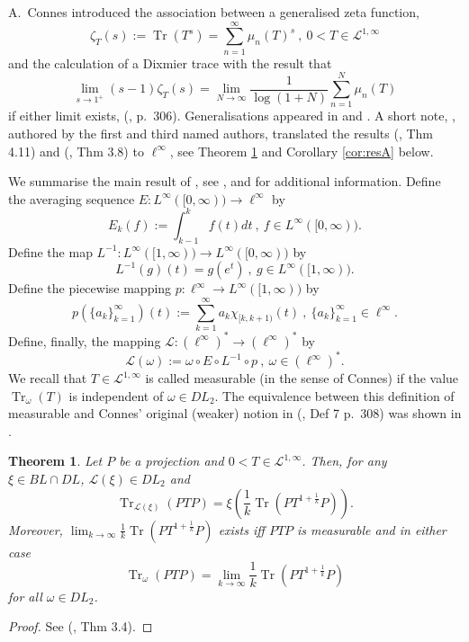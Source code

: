 \documentclass[final,1p]{elsarticle}
\numberwithin{equation}{section}
\theoremstyle{plain}
\newtheorem{thm}{Theorem}[section]
\theoremstyle{definition}
\begin{document}
\medskip A.~Connes introduced the association between a generalised zeta function,
$$
\zeta_T(s) := \operatorname{Tr}(T^s) = \sum_{n=1}^\infty \mu_{n}(T)^s \ , \ 0 < T \in \mathcal{L}^{1,\infty}
$$
and the calculation of a Dixmier trace with the result that
\begin{equation*} 
\lim_{s \to 1^+} (s-1) \zeta_T(s) = \lim_{N \to \infty} \frac{1}{\log(1+N)} \sum_{n=1}^{N} \mu_{n}(T)
\end{equation*}
if either limit exists, (\cite{CN}, p.~306).
Generalisations appeared in \cite{CRSS} and \cite{CPS}.  A short note, \cite{LS2}, authored by the first and third named authors, translated the results (\cite{CRSS}, Thm 4.11) and (\cite{CPS}, Thm 3.8) to $\ell^\infty$, see Theorem \ref{thm:resPA} and Corollary \ref{cor:resA} below.

We summarise the main result of \cite{LS2}, see \cite{CPS}, \cite{CRSS} and \cite{AF} for additional information. 
Define the averaging sequence $E : L^\infty([0,\infty)) \to \ell^\infty$ by
$$
E_k(f) :=  \int_{k-1}^k f(t)dt \ , \ f \in L^\infty([0,\infty)) .
$$
Define the map $L^{-1} : L^\infty([1,\infty)) \to L^\infty([0,\infty))$ by
$$
L^{-1}(g)(t) = g(e^t) \ , \ g \in L^\infty([1,\infty)).
$$
Define the piecewise mapping 
$
p : \ell^\infty \to L^\infty([1,\infty))
$
by
$$
p( \{a_k \}_{k=1}^\infty)(t) :=
\sum_{k=1}^\infty  a_k \chi_{[k,k+1)}(t) \ , \ \{ a_k \}_{k=1}^\infty \in \ell^\infty .
$$
Define, finally, the mapping $\mathcal{L} : (\ell^{\infty})^*
\to (\ell^{\infty})^*$ by
$$
\mathcal{L}(\omega) := \omega \circ E \circ L^{-1} \circ p \ , \
\omega \in (\ell^\infty)^*.
$$
We recall that $ T \in \mathcal{L}^{1,\infty}$ is called measurable (in the sense of Connes) if the value $\operatorname{Tr}_\omega(T)$ is independent of
$\omega \in DL_2$.  The equivalence between this definition of measurable and Connes' original (weaker) notion in (\cite{CN}, Def 7 p.~308) was shown in \cite{LSS}.

\begin{thm} \label{thm:resPA}
Let $P$ be a projection and $0 < T \in \mathcal{L}^{1,\infty}$.
Then, for any ${\ensuremath{\xi}} \in BL \cap DL$, $\mathcal{L}({\ensuremath{\xi}}) \in DL_2$ and
$$
\operatorname{Tr}_{\mathcal{L}({\ensuremath{\xi}})}(PTP) = {\ensuremath{\xi}} \left( \frac 1k \operatorname{Tr}(PT^{1+\frac 1k}P) \right) .
$$
Moreover, $\lim_{k \to \infty} \frac 1k \operatorname{Tr}(PT^{1+\frac 1k}P)$ exists iff $PTP$ is measurable and in either case 
$$
\operatorname{Tr}_{\omega}(PTP) = \lim_{k \to \infty} \frac 1k \operatorname{Tr}(PT^{1+\frac 1k}P)
$$
for all $\omega \in DL_2$.
\end{thm}
\begin{proof}
See (\cite{LS2}, Thm 3.4).
\end{proof}
\end{document}
